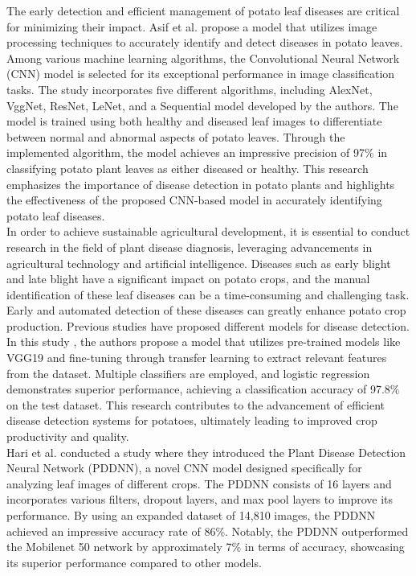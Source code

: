 \documentclass[conference]{IEEEtran}
\begin{document}
The early detection and efficient management of potato leaf diseases are critical for minimizing their impact. Asif et al. \cite{9316021} propose a model that utilizes image processing techniques to accurately identify and detect diseases in potato leaves. Among various machine learning algorithms, the Convolutional Neural Network (CNN) model is selected for its exceptional performance in image classification tasks. The study incorporates five different algorithms, including AlexNet, VggNet, ResNet, LeNet, and a Sequential model developed by the authors. The model is trained using both healthy and diseased leaf images to differentiate between normal and abnormal aspects of potato leaves. Through the implemented algorithm, the model achieves an impressive precision of 97\% in classifying potato plant leaves as either diseased or healthy. This research emphasizes the importance of disease detection in potato plants and highlights the effectiveness of the proposed CNN-based model in accurately identifying potato leaf diseases.\\


In order to achieve sustainable agricultural development, it is essential to conduct research in the field of plant disease diagnosis, leveraging advancements in agricultural technology and artificial intelligence. Diseases such as early blight and late blight have a significant impact on potato crops, and the manual identification of these leaf diseases can be a time-consuming and challenging task. Early and automated detection of these diseases can greatly enhance potato crop production. Previous studies have proposed different models for disease detection. In this study \cite{9121067}, the authors propose a model that utilizes pre-trained models like VGG19 and fine-tuning through transfer learning to extract relevant features from the dataset. Multiple classifiers are employed, and logistic regression demonstrates superior performance, achieving a classification accuracy of 97.8\% on the test dataset. This research contributes to the advancement of efficient disease detection systems for potatoes, ultimately leading to improved crop productivity and quality.\\

Hari et al. \cite{8899748} conducted a study where they introduced the Plant Disease Detection Neural Network (PDDNN), a novel CNN model designed specifically for analyzing leaf images of different crops. The PDDNN consists of 16 layers and incorporates various filters, dropout layers, and max pool layers to improve its performance. By using an expanded dataset of 14,810 images, the PDDNN achieved an impressive accuracy rate of 86\%. Notably, the PDDNN outperformed the Mobilenet 50 network by approximately 7\% in terms of accuracy, showcasing its superior performance compared to other models.\\
\end{document}
